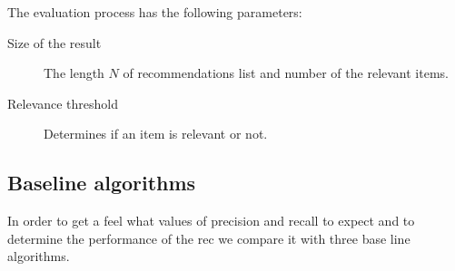 The evaluation process has the following parameters:
\begin{description}
\item[Size of the result] The length $N$ of recommendations list and number of the relevant items. 
\item[Relevance threshold] Determines if an item is relevant or not.
\end{description}

\subsection{Baseline algorithms}
\label{sec:baseline}

In order to get a feel what values of precision and recall to expect and to determine the performance of the \gls{rec} we compare it with three base line algorithms. 

